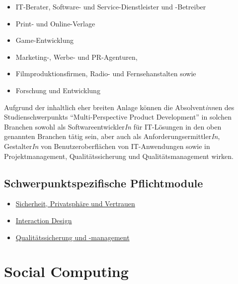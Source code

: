 \begin{itemize}
\tightlist
\item
  IT-Berater, Software- und Service-Dienstleister und -Betreiber
\item
  Print- und Online-Verlage
\item
  Game-Entwicklung
\item
  Marketing-, Werbe- und PR-Agenturen,
\item
  Filmproduktionsfirmen, Radio- und Fernsehanstalten sowie
\item
  Forschung und Entwicklung
\end{itemize}

Aufgrund der inhaltlich eher breiten Anlage können die
Absolvent\emph{inn}en des Studienschwerpunkts ``Multi-Perspective
Product Development'' in solchen Branchen sowohl als
Softwareentwickler\emph{In} für IT-Lösungen in den oben genannten
Branchen tätig sein, aber auch als Anforderungsermittler\emph{In},
Gestalter\emph{In} von Benutzeroberflächen von IT-Anwendungen sowie in
Projektmanagement, Qualitätssicherung und Qualitätsmanagement wirken.

\section*{Schwerpunktspezifische
Pflichtmodule\label{/mi-2017/modulbeschreibungen-master/schwerpunkt-multiperspective-product-development}}\label{schwerpunktspezifische-pflichtmodulepathlabelmi-2017modulbeschreibungen-masterschwerpunkt-multiperspective-product-development}

\begin{itemize}
\tightlist
\item
  \hyperref[/mi-2017/modulbeschreibungen-master/MA_WTW_Modul_IT-Sicherheit]{Sicherheit,
  Privatsphäre und Vertrauen}
\item
  \hyperref[/mi-2017/modulbeschreibungen-master/MA_HCI_InteractionDesign]{Interaction
  Design}
\item
  \hyperref[/mi-2017/modulbeschreibungen-master/MA_WTW_Modul_QUS_Winter]{Qualitätssicherung
  und -management}
\end{itemize}

\chapter{Social
Computing\label{/mi-2017/modulbeschreibungen-master/schwerpunkt-soziotechnische-systeme}}\label{social-computingpathlabelmi-2017modulbeschreibungen-masterschwerpunkt-soziotechnische-systeme}

